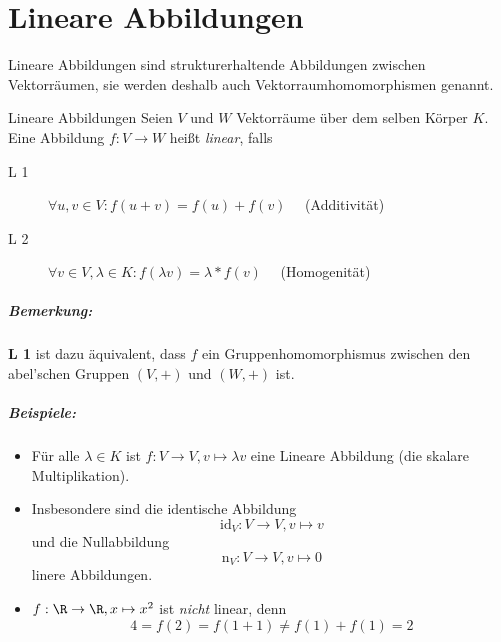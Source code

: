 \chapter{Lineare Abbildungen}
Lineare Abbildungen sind strukturerhaltende Abbildungen zwischen Vektorräumen, sie werden deshalb auch Vektorraumhomomorphismen genannt.
\begin{definition}{Lineare Abbildungen}
	Seien $V$ und $W$ Vektorräume über dem selben Körper $K$. Eine Abbildung $f:V\rightarrow W$ heißt \emph{linear}, falls
	\begin{description}
	  \item[L 1] $\forall u,v \in V : f(u+v)= f(u)+f(v)\quad$ (Additivität)
	  \item[L 2] $\forall v\in V, \lambda \in K : f(\lambda v) = \lambda * f(v)\quad$ (Homogenität)
	\end{description}
\end{definition}


\paragraph{Bemerkung:}
\textbf{L 1} ist dazu äquivalent, dass $f$ ein Gruppenhomomorphismus zwischen den abel'schen Gruppen $(V,+)$ und $(W,+)$ ist.

\paragraph{Beispiele:}
\begin{itemize}
  \item Für alle $\lambda \in K$ ist $f:V\rightarrow V, v\mapsto \lambda v$ eine Lineare Abbildung (die skalare Multiplikation).
  \item Insbesondere sind die identische Abbildung
  \begin{equation*}
    \mathrm{id}_V:V\rightarrow V, v\mapsto v
  \end{equation*}
  und die Nullabbildung
  \begin{equation*}
    \mathrm{n}_V:V\rightarrow V, v\mapsto 0
  \end{equation*}
  linere Abbildungen.

  \item $f:\R\rightarrow\R, x\mapsto x^2$ ist \emph{nicht} linear, denn
  \begin{equation*}
    4=f(2)=f(1+1)\neq f(1)+f(1) = 2
  \end{equation*}
\end{itemize}


